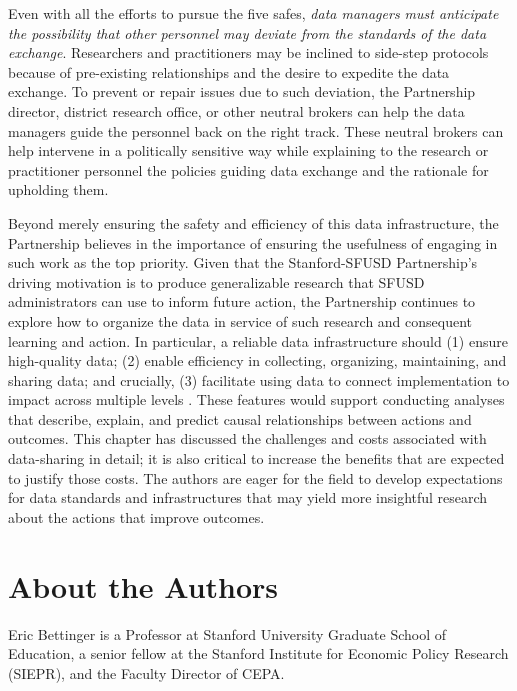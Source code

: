 \documentclass[
]{book}
\begin{document}
Even with all the efforts to pursue the five safes, \emph{data managers must anticipate the possibility that other personnel may deviate from the standards of the data exchange}. Researchers and practitioners may be inclined to side-step protocols because of pre-existing relationships and the desire to expedite the data exchange. To prevent or repair issues due to such deviation, the Partnership director, district research office, or other neutral brokers can help the data managers guide the personnel back on the right track. These neutral brokers can help intervene in a politically sensitive way while explaining to the research or practitioner personnel the policies guiding data exchange and the rationale for upholding them.

Beyond merely ensuring the safety and efficiency of this data infrastructure, the Partnership believes in the importance of ensuring the usefulness of engaging in such work as the top priority. Given that the Stanford-SFUSD Partnership's driving motivation is to produce generalizable research that SFUSD administrators can use to inform future action, the Partnership continues to explore how to organize the data in service of such research and consequent learning and action. In particular, a reliable data infrastructure should (1) ensure high-quality data; (2) enable efficiency in collecting, organizing, maintaining, and sharing data; and crucially, (3) facilitate using data to connect implementation to impact across multiple levels \citep{ming2019}. These features would support conducting analyses that describe, explain, and predict causal relationships between actions and outcomes. This chapter has discussed the challenges and costs associated with data-sharing in detail; it is also critical to increase the benefits that are expected to justify those costs. The authors are eager for the field to develop expectations for data standards and infrastructures that may yield more insightful research about the actions that improve outcomes.

\hypertarget{about-the-authors-5}{%
\section*{About the Authors}\label{about-the-authors-5}}

Eric Bettinger is a Professor at Stanford University Graduate School of Education, a senior fellow at the Stanford Institute for Economic Policy Research (SIEPR), and the Faculty Director of CEPA.
\end{document}
